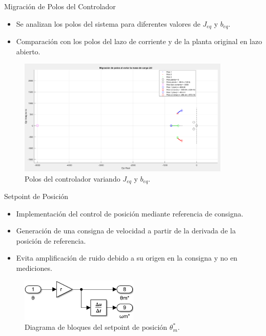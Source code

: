 \documentclass[12pt]{beamer}
\begin{document}
\begin{frame}{Migración de Polos del Controlador}
    \begin{itemize}
        \item Se analizan los polos del sistema para diferentes valores de $J_{eq}$ y $b_{eq}$.
        \item Comparación con los polos del lazo de corriente y de la planta original en lazo abierto.
    \end{itemize}
    \begin{figure}[H]
        \centering
        \includegraphics[width=0.9\textwidth]{Imagenes/MigracionPolosControlador.png}
        \caption{Polos del controlador variando $J_{eq}$ y $b_{eq}$.}
        \label{fig:migracion_polos_controlador}
    \end{figure}
\end{frame}

\begin{frame}{Setpoint de Posición}
    \begin{itemize}
        \item Implementación del control de posición mediante referencia de consigna.
        \item Generación de una consigna de velocidad a partir de la derivada de la posición de referencia.
        \item Evita amplificación de ruido debido a su origen en la consigna y no en mediciones.
    \end{itemize}
    \begin{figure}[H]
        \centering
        \includegraphics[width=0.5\textwidth]{Imagenes/setpoint.png}
        \caption{Diagrama de bloques del setpoint de posición $\theta_m^*$.}
        \label{fig:setpoint}
    \end{figure}
\end{frame}
\end{document}
